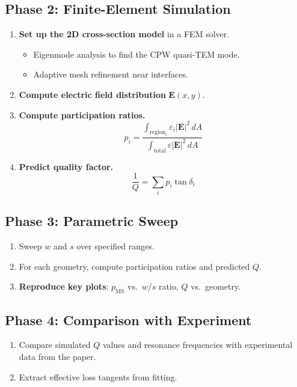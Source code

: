 \documentclass[11pt,a4paper]{article}
\begin{document}
\subsection{Phase 2: Finite-Element Simulation}
\begin{enumerate}[label=\textbf{2.\arabic*}]
  \item \textbf{Set up the 2D cross-section model} in a FEM solver.
    \begin{itemize}
      \item Eigenmode analysis to find the CPW quasi-TEM mode.
      \item Adaptive mesh refinement near interfaces.
    \end{itemize}
  \item \textbf{Compute electric field distribution} $\mathbf{E}(x, y)$.
  \item \textbf{Compute participation ratios.}
    \begin{equation*}
      p_i = \frac{\int_{\text{region}_i} \varepsilon_i |\mathbf{E}|^2 \, dA}{\int_{\text{total}} \varepsilon |\mathbf{E}|^2 \, dA}
    \end{equation*}
  \item \textbf{Predict quality factor.}
    \begin{equation*}
      \frac{1}{Q} = \sum_i p_i \tan \delta_i
    \end{equation*}
\end{enumerate}

\subsection{Phase 3: Parametric Sweep}
\begin{enumerate}[label=\textbf{3.\arabic*}]
  \item Sweep $w$ and $s$ over specified ranges.
  \item For each geometry, compute participation ratios and predicted $Q$.
  \item \textbf{Reproduce key plots}: $p_{\text{MS}}$ vs.\ $w/s$ ratio, $Q$ vs.\ geometry.
\end{enumerate}

\subsection{Phase 4: Comparison with Experiment}
\begin{enumerate}[label=\textbf{4.\arabic*}]
  \item Compare simulated $Q$ values and resonance frequencies with experimental data from the paper.
  \item Extract effective loss tangents from fitting.
\end{enumerate}
\end{document}
